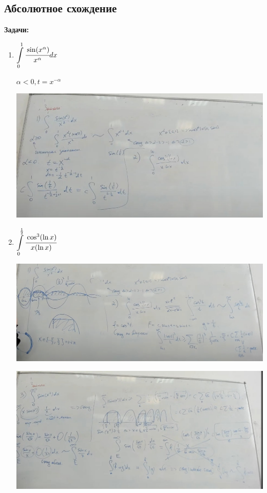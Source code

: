 \subsection{Абсолютное схождение}

\textbf{Задачи:}

\begin{enumerate}
    \item $\displaystyle\int\limits_{0}^{1}\cfrac{\sin(x^{\alpha})}{x^{\alpha}}dx$

     $\alpha < 0, t= x^{-\alpha}$

  \begin{center}
   \includegraphics[width = 17cm]{assets/11_1.jpg}
\end{center}
    \item $\displaystyle\int\limits_{0}^{\frac{1}{2}}\cfrac{\cos^3 (\ln x)}{x (\ln x)}$
  \begin{center}
   \includegraphics[width = 17cm]{assets/11_3.jpg}
\end{center}
  \begin{center}
   \includegraphics[width = 17cm]{assets/11_2.jpg}
\end{center}
\end{enumerate}